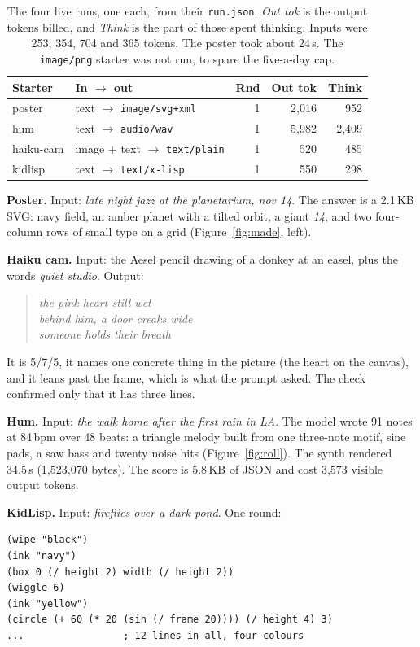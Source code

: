 \documentclass[10pt,letterpaper,twocolumn]{article}
\newcommand{\code}[1]{\texttt{#1}}
\begin{document}
\begin{table}[t]
\centering
\footnotesize
\setlength{\tabcolsep}{3pt}
\begin{tabularx}{\columnwidth}{@{}l X r r r@{}}
\toprule
Starter & In $\rightarrow$ out & Rnd & Out tok & Think \\
\midrule
poster & text $\rightarrow$ \code{image/svg+xml} & 1 & 2{,}016 & 952 \\
hum & text $\rightarrow$ \code{audio/wav} & 1 & 5{,}982 & 2{,}409 \\
haiku-cam & image + text $\rightarrow$ \code{text/plain} & 1 & 520 & 485 \\
kidlisp & text $\rightarrow$ \code{text/x-lisp} & 1 & 550 & 298 \\
\bottomrule
\end{tabularx}
\caption{The four live runs, one each, from their \code{run.json}. \emph{Out
tok} is the output tokens billed, and \emph{Think} is the part of those spent
thinking. Inputs were 253, 354, 704 and 365 tokens. The poster took about
24\,s. The \code{image/png} starter was not run, to spare the five-a-day cap.}
\label{tab:runs}
\end{table}

\textbf{Poster.} Input: \emph{late night jazz at the planetarium, nov 14}.
The answer is a 2.1\,KB SVG: navy field, an amber planet with a tilted orbit,
a giant \emph{14}, and two four-column rows of small type on a grid
(Figure~\ref{fig:made}, left).

\textbf{Haiku cam.} Input: the Aesel pencil drawing of a donkey at an easel,
plus the words \emph{quiet studio}. Output:
\begin{quote}\small\itshape
the pink heart still wet\\
behind him, a door creaks wide\\
someone holds their breath
\end{quote}
It is 5/7/5, it names one concrete thing in the picture (the heart on the
canvas), and it leans past the frame, which is what the prompt asked. The
check confirmed only that it has three lines.

\textbf{Hum.} Input: \emph{the walk home after the first rain in LA}.
The model wrote 91 notes at 84\,bpm over 48 beats: a triangle melody built
from one three-note motif, sine pads, a saw bass and twenty noise hits
(Figure~\ref{fig:roll}). The synth rendered 34.5\,s (1,523,070 bytes). The
score is 5.8\,KB of JSON and cost 3,573 visible output tokens.

\textbf{KidLisp.} Input: \emph{fireflies over a dark pond}. One round:
\begin{Verbatim}
(wipe "black")
(ink "navy")
(box 0 (/ height 2) width (/ height 2))
(wiggle 6)
(ink "yellow")
(circle (+ 60 (* 20 (sin (/ frame 20)))) (/ height 4) 3)
...                 ; 12 lines in all, four colours
\end{Verbatim}
\end{document}

